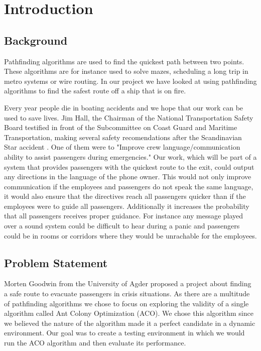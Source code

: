 \chapter{Introduction}
\label{ch:introduction}

\section{Background}

Pathfinding algorithms are used to find the quickest path between two points. 
These algorithms are for instance used to solve mazes, scheduling a long trip in
metro systems or wire routing. In our project we have looked at using pathfinding
algorithms to find the safest route off a ship that is on fire.

Every year people die in boating accidents and we hope that our work can be
used to save lives. Jim Hall, the Chairman of the National Transportation 
Safety Board testified in front of the Subcommittee on Coast Guard and Maritime 
Transportation, making several safety recomendations after the Scandinavian Star
accident \cite{ntsb}. One of them were to "Improve crew language/communication 
ability to assist passengers during emergencies." Our work, which will be part of a system
that provides passengers with the quickest route to the exit, could output 
any directions in the language of the phone owner. This would not only improve 
communication if the employees and passengers do not speak the same language, 
it would also ensure that the directives reach all passengers quicker than if the employees 
were to guide all passengers. Additionally it increases the probability that all passengers 
receives proper guidance. For instance any message played over a sound system could be
difficult to hear during a panic and passengers could be in rooms or corridors
where they would be unrachable for the employees.

\section{Problem Statement}

Morten Goodwin from the University of Agder proposed a project about finding a safe route
to evacuate passengers in crisis situations. As there are a multitude of pathfinding algorithms
we chose to focus on exploring the validity of a single algorithm called Ant Colony Optimization 
(ACO). We chose this algorithm since we believed the nature of the algorithm made it a perfect
candidate in a dynamic environment. Our goal was to create a testing environment in which 
we would run the ACO algorithm and then evaluate its performance.

